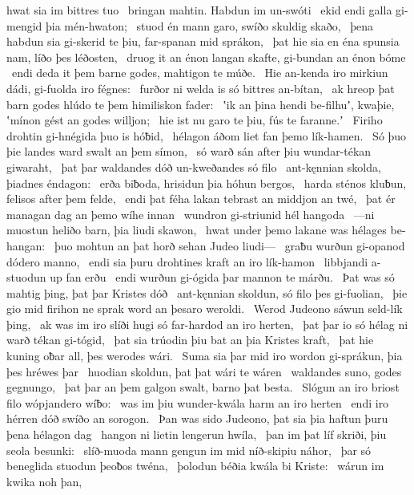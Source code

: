 hwat sia im bittres tuo \hld\ bringan mahtin.
Habdun im un-swóti \hld\ ekid endi galla
gi-mengid þia mén-hwaton; \hld\ stuod én mann garo,
swíðo skuldig skaðo, \hld\ þena habdun sia gi-skerid te þiu,
far-spanan mid sprákon, \hld\ þat hie sia en éna spunsia nam,
líðo þes léðosten, \hld\ druog it an énon langan skafte,
gi-bundan an énon bóme \hld\ endi deda it þem barne godes,
mahtigon te múðe. \hld\ Hie an-kenda iro mirkiun dádi,
gi-fuolda iro fégnes: \hld\ furðor ni welda
is só bittres an-bítan, \hld\ ak hreop þat barn godes
hlúdo te þem himiliskon fader: \hld\ ʽik an þina hendi be-filhuʼ, kwaþie,
ʽmínon gést an godes willjon; \hld\ hie ist nu garo te þiu,
fús te faranne.ʼ \hld\ Firiho drohtin
gi-hnégida þuo is hóƀid, \hld\ hélagon áðom
liet fan þemo lík-hamen. \hld\ Só þuo þie landes ward
swalt an þem símon, \hld\ só warð sán after þiu
wundar-tékan giwaraht, \hld\ þat þar waldandes dóð
un-kweðandes só filo \hld\ ant-kęnnian skolda,
þiadnes éndagon: \hld\ erða biƀoda,
hrisidun þia hóhun bergos, \hld\ harda sténos kluƀun,
felisos after þem felde, \hld\ endi þat féha lakan tebrast
an middjon an twé, \hld\ þat ér managan dag
an þemo wíhe innan \hld\ wundron gi-striunid
hél hangoda \hld\ —ni muostun heliðo barn,
þia liudi skawon, \hld\ hwat under þemo lakane was
hélages be-hangan: \hld\ þuo mohtun an þat horð sehan
Judeo liudi— \hld\ graƀu wurðun gi-opanod
dódero manno, \hld\ endi sia þuru drohtines kraft
an iro lík-hamon \hld\ libbjandi a-stuodun
up fan erðu \hld\ endi wurðun gi-ógida þar
mannon te márðu. \hld\ Þat was só mahtig þing,
þat þar Kristes dóð \hld\ ant-kęnnian skoldun,
só filo þes gi-fuolian, \hld\ þie gio mid firihon ne sprak
word an þesaro weroldi. \hld\ Werod Judeono
sáwun seld-lík þing, \hld\ ak was im iro slíði hugi
só far-hardod an iro herten, \hld\ þat þar io só hélag ni warð
tékan gi-tógid, \hld\ þat sia trúodin þiu bat
an þia Kristes kraft, \hld\ þat hie kuning oƀar all,
þes werodes wári. \hld\ Suma sia þar mid iro wordon gi-sprákun,
þia þes hréwes þar \hld\ huodian skoldun,
þat þat wári te wáren \hld\ waldandes suno,
godes gegnungo, \hld\ þat þar an þem galgon swalt,
barno þat besta. \hld\ Slógun an iro briost filo
wópjandero wíƀo: \hld\ was im þiu wunder-kwála
harm an iro herten \hld\ endi iro hérren dóð
swíðo an sorogon. \hld\ Þan was sido Judeono,
þat sia þia haftun þuru þena hélagon dag \hld\ hangon ni lietin
lengerun hwíla, \hld\ þan im þat líf skriði,
þiu seola besunki: \hld\ slíð-muoda mann
gengun im mid níð-skipiu náhor, \hld\ þar só beneglida stuodun
þeoƀos twéna, \hld\ þolodun béðia
kwála bi Kriste: \hld\ wárun im kwika noh þan,
